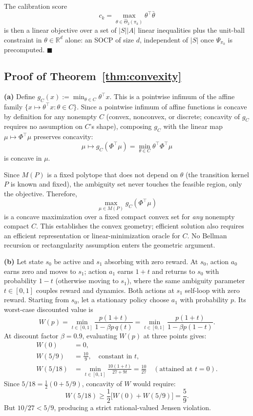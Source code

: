 \documentclass{article}
\begin{document}
The calibration score
\[
c_k = \max_{\theta\in\hat\Theta_2(\pi_k)}\theta^\top\bar\theta
\]
is then a linear objective over a set of $|S||A|$ linear inequalities plus the unit-ball constraint in $\theta\in\mathbb{R}^d$ alone: an SOCP of size $d$, independent of $|S|$ once $\Psi_{\pi_k}$ is precomputed. $\blacksquare$

\subsection{Proof of Theorem~\ref{thm:convexity}}
\label{app:proof-convexity}

\textbf{(a)} Define $g_C(x) := \min_{\theta\in C}\theta^\top x$. This is a pointwise infimum of the affine family $\{x\mapsto\theta^\top x : \theta\in C\}$. Since a pointwise infimum of affine functions is concave by definition for any nonempty $C$ (convex, nonconvex, or discrete; concavity of $g_C$ requires no assumption on $C$'s shape), composing $g_C$ with the linear map $\mu\mapsto\Phi^\top\mu$ preserves concavity:
\[
\mu \mapsto g_C(\Phi^\top\mu) = \min_{\theta\in C}\theta^\top\Phi^\top\mu
\]
is concave in $\mu$.

Since $M(P)$ is a fixed polytope that does not depend on $\theta$ (the transition kernel $P$ is known and fixed), the ambiguity set never touches the feasible region, only the objective. Therefore,
\[
\max_{\mu\in M(P)} g_C(\Phi^\top\mu)
\]
is a concave maximization over a fixed compact convex set for \emph{any}
nonempty compact $C$. This establishes the convex geometry; efficient solution
also requires an efficient representation or linear-minimization oracle for
$C$. No Bellman recursion or rectangularity assumption enters the geometric
argument.

\textbf{(b)} Let state $s_0$ be active and $s_1$ absorbing with zero reward.
At $s_0$, action $a_0$ earns zero and moves to $s_1$; action $a_1$ earns
$1+t$ and returns to $s_0$ with probability $1-t$ (otherwise moving to
$s_1$), where the same ambiguity parameter $t\in[0,1]$ couples reward and
dynamics. Both actions at $s_1$ self-loop with zero reward. Starting from
$s_0$, let a stationary policy choose $a_1$ with probability $p$. Its
worst-case discounted value is
\[
W(p) = \min_{t\in[0,1]} \frac{p(1+t)}{1-\beta p\,q(t)} = \min_{t\in[0,1]} \frac{p(1+t)}{1-\beta p(1-t)}.
\]
At discount factor $\beta=0.9$, evaluating $W(p)$ at three points gives:
\begin{align*}
W(0) &= 0, \\
W(5/9) &= \frac{10}{9}, \quad \text{constant in }t, \\
W(5/18) &= \min_{t\in[0,1]}
  \frac{10(1+t)}{27+9t} = \frac{10}{27}
  \quad (\text{attained at }t=0).
\end{align*}
Since $5/18 = \tfrac12(0 + 5/9)$, concavity of $W$ would require:
\[
W(5/18) \geq \frac{1}{2}\big[W(0) + W(5/9)\big] = \frac{5}{9}.
\]
But $10/27<5/9$, producing a strict rational-valued Jensen violation.
\end{document}
